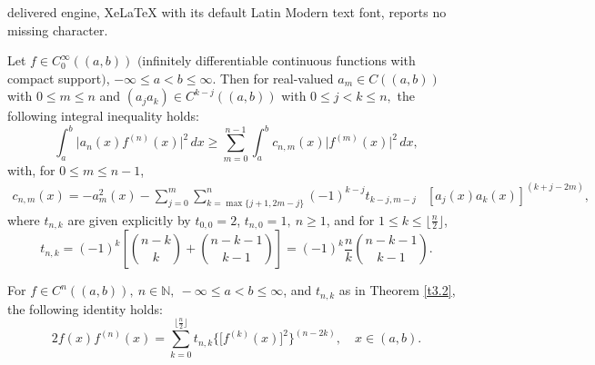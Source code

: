 \documentclass[10pt,a4paper]{amsart}
\newcommand{\bbN}{{\mathbb{N}}}
\begin{document}
delivered engine, XeLaTeX with its default Latin Modern text font, reports no missing character.
\begin{theorem}\label{t3.2}
Let $f\in C^\infty_0((a,b))$ $($infinitely differentiable continuous functions with compact support$)$, $-\infty\leq a<b\leq\infty$. Then for real-valued $a_m\in C((a,b))$ with $0\leq m\leq n$ 
and $ (a_j a_k)\in C^{k-j}((a,b))$ with $0\leq j< k\leq n,$ the following integral inequality holds$:$
\begin{equation}\label{3.2}
\int_a^b \big|a_n(x)f^{(n)} (x)\big|^2 \, dx\geq  \sum_{m=0}^{n-1}\int_a^b c_{n,m}(x)\big|f^{(m)}(x)\big|^2\, dx, 
\end{equation}
with, for $0\leq m\leq n-1$,
\begin{align}\label{3.6}
c_{n,m}(x)=-a_m^2(x)-\sum_{j=0}^m \sum_{k=\max\{j+1,2m-j\}}^n (-1)^{k-j} t_{k-j,m-j} &[a_j(x)a_k(x)]^{(k+j-2m)},
\end{align}
where $t_{n,k}$ are given explicitly by $t_{0,0}=2$, $t_{n,0} = 1,\ n \geq 1$, and for $1\leq k\leq \lfloor \tfrac{n}{2}\rfloor$,
\begin{equation}
\label{2.13}
t_{n,k}=(-1)^k \left[\binom{n-k}{k}+\binom{n-k-1}{k-1} \right]=(-1)^k \frac{n}{k}\binom{n-k-1}{k-1}.
\end{equation}
\end{theorem}

\begin{lemma}\label{l2.1}
For $f\in C^n((a,b)),\ n\in\bbN,\ -\infty\leq a<b\leq\infty$, and $t_{n,k}$ as in Theorem \ref{t3.2}, the following identity holds$:$
\begin{equation}\label{2.12}
2f(x)f^{(n)}(x)=\sum_{k=0}^{\lfloor \frac{n}{2}\rfloor} t_{n,k} \big\{\big[f^{(k)}(x)\big]^2\big\}^{(n-2k)},\quad x\in(a,b).
\end{equation}
\end{lemma}
\end{document}
